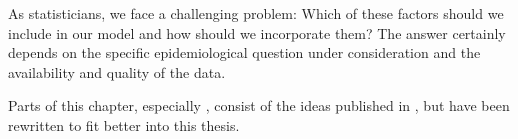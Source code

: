 As statisticians, we face a challenging problem: Which of these factors should we include in our model and how should we incorporate them? The answer certainly depends on the specific epidemiological question under consideration and the availability and quality of the data. 

Parts of this chapter, especially , consist of the ideas published in \citep{Heyder2023Measures}, but have been rewritten to fit better into this thesis.





